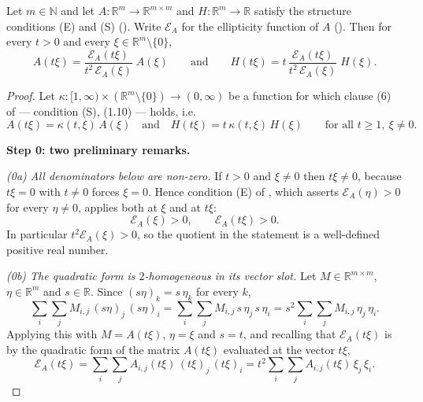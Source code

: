 \begin{theorem}
Let $m\in\mathbb N$ and let $A:\mathbb R^{m}\to\mathbb R^{m\times m}$ and
$H:\mathbb R^{m}\to\mathbb R$ satisfy the structure conditions (E) and (S)
(). Write $\mathcal E_A$ for the ellipticity function of $A$
(). Then for every $t>0$ and every $\xi\in\mathbb R^{m}\setminus\{0\}$,
\[
 A(t\xi)=\frac{\mathcal E_A(t\xi)}{t^{2}\,\mathcal E_A(\xi)}\;A(\xi)
 \qquad\text{and}\qquad
 H(t\xi)=t\,\frac{\mathcal E_A(t\xi)}{t^{2}\,\mathcal E_A(\xi)}\;H(\xi).
\]
\end{theorem}
\begin{proof}
Let $\kappa:[1,\infty)\times(\mathbb R^{m}\setminus\{0\})\to(0,\infty)$ be a function for
which clause (6) of  --- condition (S), (1.10) --- holds,
i.e.
\[
 A(t\xi)=\kappa(t,\xi)\,A(\xi)\quad\text{and}\quad H(t\xi)=t\,\kappa(t,\xi)\,H(\xi)
 \qquad\text{for all }t\ge1,\ \xi\ne0. \tag{S}
\]

\medskip\noindent\textbf{Step 0: two preliminary remarks.}

\emph{(0a) All denominators below are non-zero.} If $t>0$ and $\xi\ne0$ then $t\xi\ne0$,
because $t\xi=0$ with $t\ne0$ forces $\xi=0$. Hence condition (E) of
, which asserts $\mathcal E_A(\eta)>0$ for every $\eta\ne0$,
applies both at $\xi$ and at $t\xi$:
\[
 \mathcal E_A(\xi)>0,\qquad \mathcal E_A(t\xi)>0 . \tag{0a}
\]
In particular $t^{2}\mathcal E_A(\xi)>0$, so the quotient in the statement is a well-defined
positive real number.

\emph{(0b) The quadratic form is $2$-homogeneous in its vector slot.} Let
$M\in\mathbb R^{m\times m}$, $\eta\in\mathbb R^{m}$ and $s\in\mathbb R$. Since
$(s\eta)_k=s\,\eta_k$ for every $k$,
\[
 \sum_{i}\sum_{j}M_{i,j}\,(s\eta)_j\,(s\eta)_i
  =\sum_{i}\sum_{j}M_{i,j}\,s\,\eta_j\,s\,\eta_i
  =s^{2}\sum_{i}\sum_{j}M_{i,j}\,\eta_j\,\eta_i . \tag{0b}
\]
Applying this with $M=A(t\xi)$, $\eta=\xi$ and $s=t$, and recalling that
$\mathcal E_A(t\xi)$ is by  the quadratic form of the matrix $A(t\xi)$
evaluated at the vector $t\xi$,
\[
 \mathcal E_A(t\xi)=\sum_{i}\sum_{j}A_{i,j}(t\xi)\,(t\xi)_j\,(t\xi)_i
  =t^{2}\sum_{i}\sum_{j}A_{i,j}(t\xi)\,\xi_j\,\xi_i . \tag{0b$'$}
\]


\end{proof}
